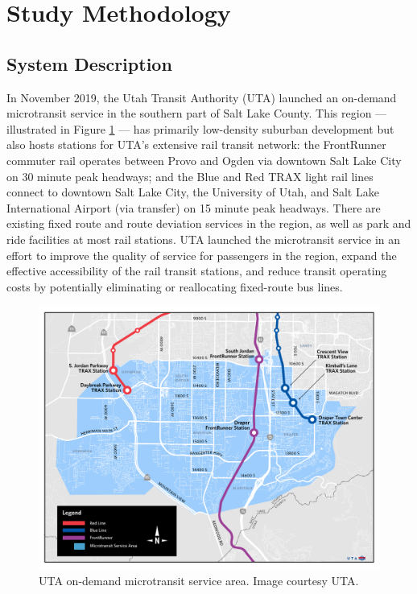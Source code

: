 \documentclass[smartcities,article,submit,moreauthors,pdftex]{Definitions/mdpi}
\begin{document}
\section{Study Methodology}
\subsection{System Description}

In November 2019, the Utah Transit Authority (UTA) launched an on-demand microtransit service in the southern part of Salt Lake County. This region --- illustrated in Figure \ref{fig:via-map} --- has primarily low-density suburban development but also hosts stations for UTA's extensive rail transit network: the FrontRunner commuter rail operates between Provo and Ogden via downtown Salt Lake City on 30 minute peak headways; and the Blue and Red TRAX light rail lines connect to downtown Salt Lake City, the University of Utah, and Salt Lake International Airport (via transfer) on 15 minute peak headways. There are existing fixed route and route deviation services in the region, as well as park and ride facilities at most rail stations. UTA launched the microtransit service in an effort to improve the quality of service for passengers in the region, expand the effective accessibility of the rail transit stations, and reduce transit operating costs by potentially eliminating or reallocating fixed-route bus lines.

\begin{figure}
    \centering
    \includegraphics[width = \textwidth]{via-map}
    \caption{UTA on-demand microtransit service area. Image courtesy UTA.}
    \label{fig:via-map}
\end{figure}
\end{document}
